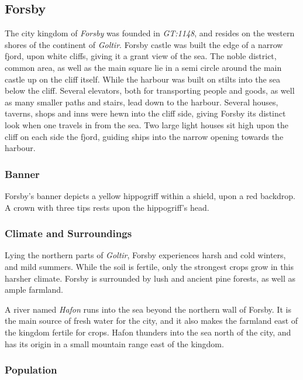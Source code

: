 \subsection{Forsby}
\label{sec:Forsby}


The city kingdom of \emph{Forsby} was founded in \emph{GT:1148}, and resides
on the western shores of the continent of \emph{Goltir}. Forsby castle was
built the edge of a narrow fjord, upon white cliffs, giving it a grant view of
the sea. The noble district, common area, as well as the main square lie in a
semi circle around the main castle up on the cliff itself. While the harbour
was built on stilts into the sea below the cliff. Several elevators, both for
transporting people and goods, as well as many smaller paths and stairs, lead
down to the harbour. Several houses, taverns, shops and inns were hewn into
the cliff side, giving Forsby its distinct look when one travels in from the
sea. Two large light houses sit high upon the cliff on each side the fjord,
guiding ships into the narrow opening towards the harbour.

\subsubsection{Banner}

Forsby's banner depicts a yellow hippogriff within a shield, upon a red
backdrop. A crown with three tips rests upon the hippogriff's head.

\subsubsection{Climate and Surroundings}

Lying the northern parts of \emph{Goltir}, Forsby experiences harsh and cold
winters, and mild summers. While the soil is fertile, only the strongest crops
grow in this harsher climate. Forsby is surrounded by lush and ancient pine
forests, as well as ample farmland.

A river named \emph{Hafon} runs into the sea beyond the northern wall of
Forsby. It is the main source of fresh water for the city, and it also makes
the farmland east of the kingdom fertile for crops. Hafon thunders into the
sea north of the city, and has its origin in a small mountain range east of
the kingdom.

\subsubsection{Population}

